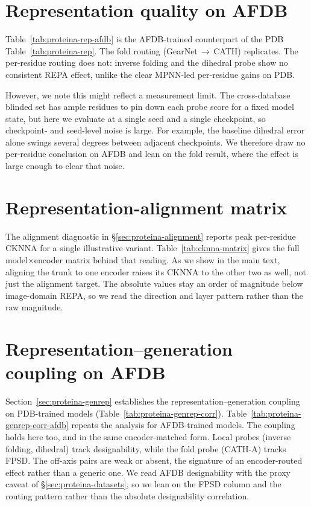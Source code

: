 \documentclass[12pt,a4paper,twoside]{report}
\begin{document}
\section{Representation quality on AFDB}
\label{app:rep-afdb}

Table~\ref{tab:proteina-rep-afdb} is the AFDB-trained counterpart of the PDB Table~\ref{tab:proteina-rep}. The fold routing (GearNet\,$\to$\,CATH) replicates. The per-residue routing does not: inverse folding and the dihedral probe show no consistent REPA effect, unlike the clear MPNN-led per-residue gains on PDB.

However, we note this might reflect a measurement limit. The cross-database blinded set has ample residues to pin down each probe score for a fixed model state, but here we evaluate at a single seed and a single checkpoint, so checkpoint- and seed-level noise is large. For example, the baseline dihedral error alone swings several degrees between adjacent checkpoints. We therefore draw no per-residue conclusion on AFDB and lean on the fold result, where the effect is large enough to clear that noise.



\section{Representation-alignment matrix}
\label{app:cknna}

The alignment diagnostic in \S\ref{sec:proteina-alignment} reports peak per-residue CKNNA for a single illustrative variant. Table~\ref{tab:cknna-matrix} gives the full model$\times$encoder matrix behind that reading. As we show in the main text, aligning the trunk to one encoder raises its CKNNA to the other two as well, not just the alignment target. The absolute values stay an order of magnitude below image-domain REPA, so we read the direction and layer pattern rather than the raw magnitude.



\section{Representation--generation coupling on AFDB}
\label{app:genrep-afdb}

Section~\ref{sec:proteina-genrep} establishes the representation--generation coupling on PDB-trained models (Table~\ref{tab:proteina-genrep-corr}). Table~\ref{tab:proteina-genrep-corr-afdb} repeats the analysis for AFDB-trained models. The coupling holds here too, and in the same encoder-matched form. Local probes (inverse folding, dihedral) track designability, while the fold probe (CATH-A) tracks FPSD. The off-axis pairs are weak or absent, the signature of an encoder-routed effect rather than a generic one. We read AFDB designability with the proxy caveat of \S\ref{sec:proteina-datasets}, so we lean on the FPSD column and the routing pattern rather than the absolute designability correlation.
\end{document}
